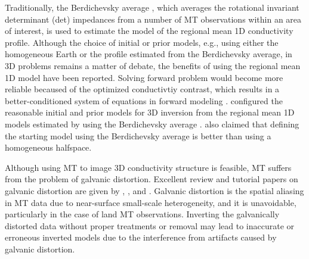 	Traditionally, the Berdichevsky average \citep{berdichevsky1980a}, which  averages the rotational invariant determinant (det) impedances from a number of MT observations within an area of interest, is used to estimate the model of the regional mean 1D conductivity profile. 
	Although the choice of initial or prior models, e.g., using either the homogeneous Earth or the profile estimated from the Berdichevsky average, in 3D problems remains a matter of debate, the benefits of using the regional mean 1D model have been reported.
	Solving forward problem would become more reliable becaused of the optimized conductivtiy contrast, which results in a better-conditioned system of equations in forward modeling \citep{avdeev2005a}. 
	\citet{tada2014a} configured the reasonable initial and prior models for 3D inversion from the regional mean 1D models estimated by using the Berdichevsky average \citep{baba2010a}. \citet{avdeeva2015a} also claimed that defining the starting model using the Berdichevsky average is better than using a homogeneous halfspace.	


	Although using MT to image 3D conductivity structure is feasible, MT  suffers from the problem of galvanic distortion.
	Excellent review and tutorial papers on galvanic distortion are given by \citealt{jiracek1990a}, \citealt{groom1992a}, and \citealt{ledo2005a}.
	Galvanic distortion is the spatial aliasing in MT data due to near-surface small-scale heterogeneity, and it is unavoidable, particularly in the case of land MT observations. 
Inverting the galvanically distorted data without proper treatments or removal may lead to inaccurate or erroneous inverted models \citep{avdeeva2015a, tietze2015a} due to the interference from artifacts caused by galvanic distortion.	

